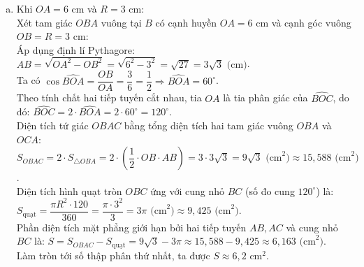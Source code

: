 \begin{bt}
{\begin{enumerate}[a)]
    Xét $\triangle BCD$ vuông tại $C$ có $CD \perp BC$, suy ra trong tam giác vuông $BDE$ (nếu $DE$ là tiếp tuyến):\\
    Ta có $\widehat{ODE} = 90^\circ \Leftrightarrow DE \perp OD$.\\
    Thật vậy, xét $\triangle OAD$ và các tam giác liên quan, ta có $OG \perp AD$ và $BC \perp OA$ tại $H$, suy ra $O$ là trực tâm hoặc giao điểm các đường cao.\\
    Từ $\triangle BCD$ vuông tại $C$ có $CD \perp BE$. Mặt khác $AH \perp BE$ và $OG \perp AD$, suy ra $\widehat{EDB} = 90^\circ$.\\
    Vậy $DE \perp BD$ tại điểm $D$ thuộc đường tròn $(O)$, do đó $DE$ là tiếp tuyến của $(O)$.
    \item Khi $OA = 6\text{ cm}$ và $R = 3\text{ cm}$:\\
    Xét tam giác $OBA$ vuông tại $B$ có cạnh huyền $OA = 6\text{ cm}$ và cạnh góc vuông $OB = R = 3\text{ cm}$:\\
    Áp dụng định lí Pythagore:
    $AB = \sqrt{OA^2 - OB^2} = \sqrt{6^2 - 3^2} = \sqrt{27} = 3\sqrt{3}\text{ (cm)}$.\\
    Ta có $\cos \widehat{BOA} = \dfrac{OB}{OA} = \dfrac{3}{6} = \dfrac{1}{2} \Rightarrow \widehat{BOA} = 60^\circ$.\\
    Theo tính chất hai tiếp tuyến cắt nhau, tia $OA$ là tia phân giác của $\widehat{BOC}$, do đó:
    $\widehat{BOC} = 2 \cdot \widehat{BOA} = 2 \cdot 60^\circ = 120^\circ$.\\
    Diện tích tứ giác $OBAC$ bằng tổng diện tích hai tam giác vuông $OBA$ và $OCA$:
    $S_{OBAC} = 2 \cdot S_{\triangle OBA} = 2 \cdot \left(\dfrac{1}{2} \cdot OB \cdot AB\right) = 3 \cdot 3\sqrt{3} = 9\sqrt{3}\text{ (cm}^2\text{)} \approx 15{,}588\text{ (cm}^2\text{)}$.\\
    Diện tích hình quạt tròn $OBC$ ứng với cung nhỏ $BC$ (số đo cung $120^\circ$) là:
    $S_{\text{quạt}} = \dfrac{\pi R^2 \cdot 120}{360} = \dfrac{\pi \cdot 3^2}{3} = 3\pi\text{ (cm}^2\text{)} \approx 9{,}425\text{ (cm}^2\text{)}$.\\
    Phần diện tích mặt phẳng giới hạn bởi hai tiếp tuyến $AB, AC$ và cung nhỏ $BC$ là:
    $S = S_{OBAC} - S_{\text{quạt}} = 9\sqrt{3} - 3\pi \approx 15{,}588 - 9{,}425 \approx 6{,}163\text{ (cm}^2\text{)}$.\\
    Làm tròn tới số thập phân thứ nhất, ta được $S \approx 6{,}2\text{ cm}^2$.
\end{enumerate}
}
\end{bt}
